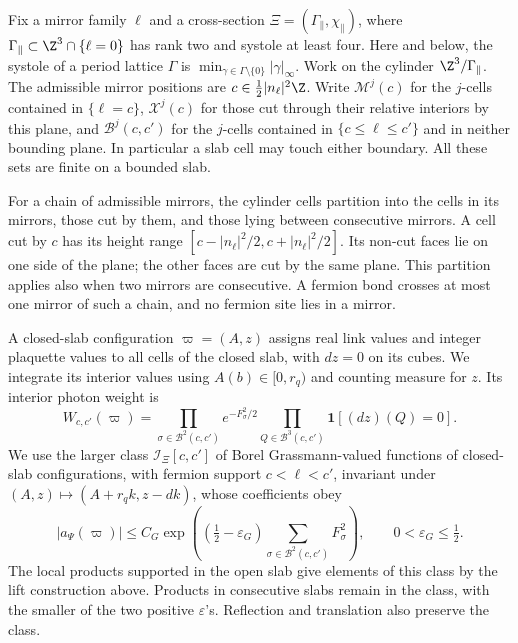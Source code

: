 Fix a mirror family $\ell$ and a cross-section
$\Xi=(\Gamma_\parallel,\chi_\parallel)$, where
$\Gamma_\parallel\subset\Z^3\cap\{\ell=0\}$ has rank two and systole
at least four. Here and below, the systole of a period lattice
$\Gamma$ is $\min_{\gamma\in\Gamma\setminus\{0\}}|\gamma|_\infty$.
Work on the cylinder $\Z^3/\Gamma_\parallel$. The
admissible mirror positions are
$c\in\frac12|n_\ell|^2\Z$. Write $\mathcal M^j(c)$ for the $j$-cells
contained in $\{\ell=c\}$, $\mathcal X^j(c)$ for those cut through
their relative interiors by this plane, and $\mathcal B^j(c,c')$ for
the $j$-cells contained in $\{c\le\ell\le c'\}$ and in neither
bounding plane. In particular a slab cell may touch either boundary.
All these sets are finite on a bounded slab.

For a chain of admissible mirrors, the cylinder cells partition into
the cells in its mirrors, those cut by them, and those lying between
consecutive mirrors. A cell cut by $c$ has its height range
$[c-|n_\ell|^2/2,c+|n_\ell|^2/2]$. Its non-cut faces lie on one
side of the plane; the other faces are cut by the same plane. This
partition applies also when two mirrors are consecutive. A fermion
bond crosses at most one mirror of such a chain, and no fermion site
lies in a mirror.

A closed-slab configuration $\varpi=(A,z)$ assigns real link values
and integer plaquette values to all cells of the closed slab, with
$dz=0$ on its cubes. We integrate its interior values using
$A(b)\in[0,r_q)$ and counting measure for $z$. Its interior photon
weight is
\begin{equation}\label{eq:slab-interior-weight}
 W_{c,c'}(\varpi)=
    \prod_{\sigma\in\mathcal B^2(c,c')}e^{-F_\sigma^2/2}
    \prod_{Q\in\mathcal B^3(c,c')}\mathbf1[(dz)(Q)=0].
\end{equation}
We use the larger class $\mathcal I_\Xi[c,c']$ of Borel
Grassmann-valued functions of closed-slab configurations, with fermion
support $c<\ell<c'$, invariant under
$(A,z)\mapsto(A+r_qk,z-dk)$, whose coefficients obey
\begin{equation}\label{eq:slab-integrand-growth}
 |a_\Psi(\varpi)|\le C_G
   \exp\left((\tfrac12-\varepsilon_G)
          \sum_{\sigma\in\mathcal B^2(c,c')}F_\sigma^2\right),
 \qquad 0<\varepsilon_G\le\tfrac12.
\end{equation}
The local products supported in the open slab give elements of this
class by the lift construction above. Products in consecutive slabs
remain in the class, with the smaller of the two positive
$\varepsilon$'s. Reflection and translation also preserve the class.

